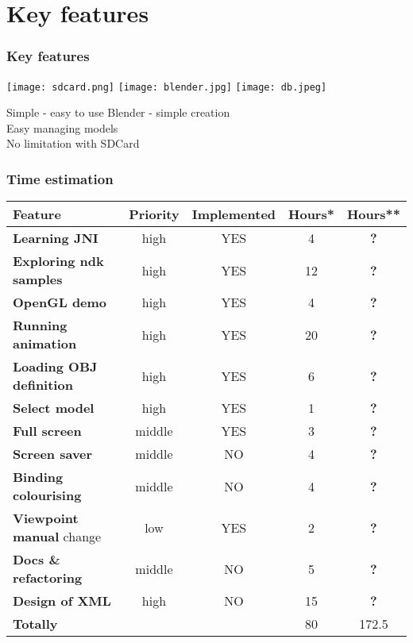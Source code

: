 \section{Key features} %
\begin{frame}\frametitle{Key features} 
\texttt{[image: sdcard.png]}
\texttt{[image: blender.jpg]}
\texttt{[image: db.jpeg]}
  \begin{block}{Simple - easy to use}
   Blender - simple creation \\
   Easy managing models \\
   No limitation with SDCard
  \end{block}
\end{frame}

\begin{frame}\frametitle{Time estimation} 
\begin{tabular}{| l || c | c |  c | c |}
\hline
Feature & Priority & Implemented & Hours* & Hours**\\
\hline
\hline
\textbf{Learning JNI} & high & YES &                 4 & {\bf ?} \\
\textbf{Exploring ndk samples} & high & YES &       12 &  {\bf ?} \\
\textbf{OpenGL demo} & high & YES &                  4 & {\bf ?} \\
\textbf{Running animation} & high & YES &           20 & {\bf ?} \\
\textbf{Loading OBJ definition} & high & YES &       6 &  {\bf ?} \\
\textbf{Select model} & high & YES &                 1 & {\bf ?} \\
\textbf{Full screen} & middle & YES &                3 &  {\bf ?} \\
\textbf{Screen saver} & middle & NO &                4 & {\bf ?} \\
\textbf{Binding colourising} & middle & NO &         4 & {\bf ?} \\
\textbf{Viewpoint manual} change & low & YES &       2 & {\bf ?} \\
\textbf{Docs \& refactoring} & middle & NO &         5 & {\bf ?} \\
\textbf{Design of XML} & high & NO &                15 & {\bf ?} \\
\hline
\textbf{Totally} &  & &                               80 & 172.5 \\
\hline
\end{tabular}
\end{frame}

